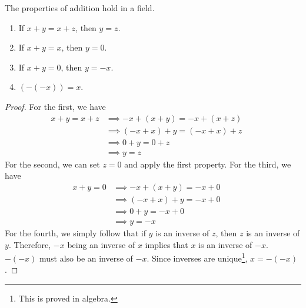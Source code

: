     \begin{lemma}
      The properties of addition hold in a field. 
      \begin{enumerate}
        \item If $x + y = x + z$, then $y = z$. 
        \item If $x + y = x$, then $y = 0$. 
        \item If $x + y = 0$, then $y = -x$. 
        \item $(-(-x)) = x$. 
      \end{enumerate}
    \end{lemma}
    \begin{proof}
      For the first, we have 
      \begin{align}
        x + y = x + z & \implies -x + (x + y) = -x + (x + z) && \tag{addition is a function} \\
                      & \implies (-x + x) + y = (-x + x) + z && \tag{$+$ is associative} \\
                      & \implies 0 + y = 0 + z && \tag{definition of additive inverse} \\
                      & \implies y = z && \tag{definition of identity}
      \end{align} 
      For the second, we can set $z = 0$ and apply the first property. For the third, we have 
      \begin{align}
        x + y = 0 & \implies -x + (x + y) = -x + 0 && \tag{addition is a function} \\
                  & \implies (-x + x) + y = -x + 0 && \tag{$+$ is associative} \\
                  & \implies 0 + y = -x + 0 && \tag{definition of additive inverse} \\
                  & \implies y = -x && \tag{definition of identity}
      \end{align}
      For the fourth, we simply follow that if $y$ is an inverse of $z$, then $z$ is an inverse of $y$. Therefore, $-x$ being an inverse of $x$ implies that $x$ is an inverse of $-x$. $-(-x)$ must also be an inverse of $-x$. Since inverses are unique\footnote{This is proved in algebra.}, $x = -(-x)$. 
    \end{proof}

